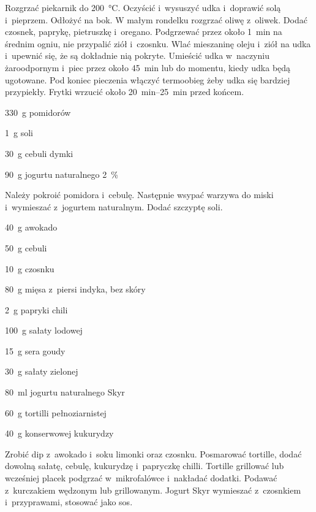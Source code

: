 \documentclass[../kucharek.tex]{subfiles}
\begin{document}
Rozgrzać piekarnik do \qty{200}{\celsius}. Oczyścić i~wysuszyć udka i~doprawić
solą i~pieprzem. Odłożyć na bok. W małym rondelku rozgrzać oliwę z~oliwek.
Dodać czosnek, paprykę, pietruszkę i~oregano. Podgrzewać przez około
\qty{1}{\minute} na średnim ogniu, nie przypalić ziół i~czosnku. Wlać
mieszaninę oleju i~ziół na udka i~upewnić się, że są dokładnie nią pokryte.
Umieścić udka w~naczyniu żaroodpornym i~piec przez około \qty{45}{\minute} lub
do momentu, kiedy udka będą ugotowane. Pod koniec pieczenia włączyć termoobieg
żeby udka się bardziej przypiekły. Frytki wrzucić około
\qtyrange{20}{25}{\minute} przed końcem.


\begin{Ingred}
    \item \qty{330}{\gram} pomidorów
    \item \qty{1}{\gram} soli
    \item \qty{30}{\gram} cebuli dymki
    \item \qty{90}{\gram} jogurtu naturalnego \qty{2}{\percent}
\end{Ingred}

Należy pokroić pomidora i~cebulę. Następnie wsypać warzywa do miski i~wymieszać
z~jogurtem naturalnym. Dodać szczyptę soli.


\begin{Ingred}
    \item \qty{40}{\gram} awokado
    \item \qty{50}{\gram} cebuli
    \item \qty{10}{\gram} czosnku
    \item \qty{80}{\gram} mięsa z~piersi indyka, bez skóry
    \item \qty{2}{\gram} papryki chili
    \item \qty{100}{\gram} sałaty lodowej
    \item \qty{15}{\gram} sera goudy
    \item \qty{30}{\gram} sałaty zielonej
    \item \qty{80}{\milli\litre} jogurtu naturalnego Skyr
    \item \qty{60}{\gram} tortilli pełnoziarnistej
    \item \qty{40}{\gram} konserwowej kukurydzy
\end{Ingred}

Zrobić dip z~awokado i~soku limonki oraz czosnku. Posmarować tortille, dodać
dowolną sałatę, cebulę, kukurydzę i~papryczkę chilli. Tortille grillować lub
wcześniej placek podgrzać w~mikrofalówce i~nakładać dodatki. Podawać
z~kurczakiem wędzonym lub grillowanym. Jogurt Skyr wymieszać z~czosnkiem
i~przyprawami, stosować jako sos.
\end{document}
